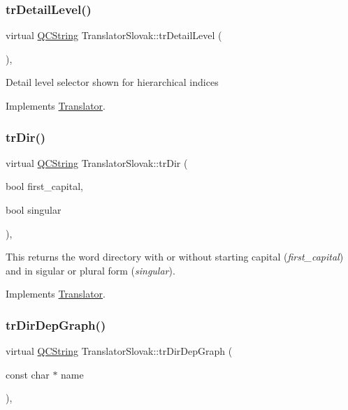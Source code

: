 \subsubsection{\texorpdfstring{trDetailLevel()}{trDetailLevel()}}
{\footnotesize\ttfamily virtual \mbox{\hyperlink{class_q_c_string}{Q\+C\+String}} Translator\+Slovak\+::tr\+Detail\+Level (\begin{DoxyParamCaption}{ }\end{DoxyParamCaption})\hspace{0.3cm}{\ttfamily [inline]}, {\ttfamily [virtual]}}

Detail level selector shown for hierarchical indices 

Implements \mbox{\hyperlink{class_translator}{Translator}}.

\mbox{\label{class_translator_slovak_ab64c81e7d6a2cd7aa28c9eb24b700b95}} 
\subsubsection{\texorpdfstring{trDir()}{trDir()}}
{\footnotesize\ttfamily virtual \mbox{\hyperlink{class_q_c_string}{Q\+C\+String}} Translator\+Slovak\+::tr\+Dir (\begin{DoxyParamCaption}\item[{bool}]{first\+\_\+capital,  }\item[{bool}]{singular }\end{DoxyParamCaption})\hspace{0.3cm}{\ttfamily [inline]}, {\ttfamily [virtual]}}

This returns the word directory with or without starting capital ({\itshape first\+\_\+capital}) and in sigular or plural form ({\itshape singular}). 

Implements \mbox{\hyperlink{class_translator}{Translator}}.

\mbox{\label{class_translator_slovak_a40c11ac2f3d33292b043adf1ef4e6d66}} 
\subsubsection{\texorpdfstring{trDirDepGraph()}{trDirDepGraph()}}
{\footnotesize\ttfamily virtual \mbox{\hyperlink{class_q_c_string}{Q\+C\+String}} Translator\+Slovak\+::tr\+Dir\+Dep\+Graph (\begin{DoxyParamCaption}\item[{const char $\ast$}]{name }\end{DoxyParamCaption})\hspace{0.3cm}{\ttfamily [inline]}, {\ttfamily [virtual]}}

